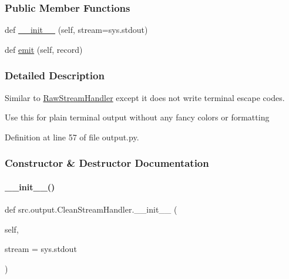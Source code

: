 \subsubsection*{Public Member Functions}
\begin{DoxyCompactItemize}
\item 
def \hyperlink{classsrc_1_1output_1_1CleanStreamHandler_a64962748de818a3d7c79cc3814c113cd}{\+\_\+\+\_\+init\+\_\+\+\_\+} (self, stream=sys.\+stdout)
\item 
def \hyperlink{classsrc_1_1output_1_1CleanStreamHandler_aa7b7a73874a639c340115dae4279bf5b}{emit} (self, record)
\end{DoxyCompactItemize}


\subsubsection{Detailed Description}
Similar to \hyperlink{classsrc_1_1output_1_1RawStreamHandler}{Raw\+Stream\+Handler} except it does not write terminal escape codes. 

Use this for \textquotesingle{}plain\textquotesingle{} terminal output without any fancy colors or formatting 

Definition at line 57 of file output.\+py.



\subsubsection{Constructor \& Destructor Documentation}
\mbox{\label{classsrc_1_1output_1_1CleanStreamHandler_a64962748de818a3d7c79cc3814c113cd}} 
\paragraph{\texorpdfstring{\+\_\+\+\_\+init\+\_\+\+\_\+()}{\_\_init\_\_()}}
{\footnotesize\ttfamily def src.\+output.\+Clean\+Stream\+Handler.\+\_\+\+\_\+init\+\_\+\+\_\+ (\begin{DoxyParamCaption}\item[{}]{self,  }\item[{}]{stream = {\ttfamily sys.stdout} }\end{DoxyParamCaption})}



